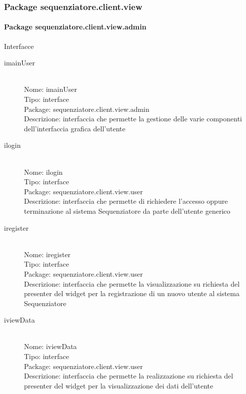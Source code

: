 \subsubsection{Package sequenziatore.client.view}
\paragraph{Package sequenziatore.client.view.admin}
Interfacce \\
\begin{description}
	\item[imainUser] 
  	\hfill \\
  	Nome: imainUser\\
  	Tipo: interface\\
	Package: sequenziatore.client.view.admin\\
	Descrizione: interfaccia che permette la gestione delle varie componenti 	dell'interfaccia grafica dell'utente
\end{description}

\begin{description}
	\item[ilogin] 
  	\hfill \\
  	Nome: ilogin\\
  	Tipo: interface\\
	Package: sequenziatore.client.view.user\\
	Descrizione: interfaccia che permette di richiedere l'accesso oppure terminazione al sistema Sequenziatore da parte dell’utente generico
\end{description}

\begin{description}
	\item[iregister] 
  	\hfill \\
  	Nome: iregister\\
  	Tipo: interface\\
	Package: sequenziatore.client.view.user\\
	Descrizione: interfaccia che permette la visualizzazione su richiesta del presenter del widget per la registrazione di un nuovo utente al sistema Sequenziatore
\end{description}

\begin{description}
	\item[iviewData] 
  	\hfill \\
  	Nome: iviewData\\
  	Tipo: interface\\
	Package: sequenziatore.client.view.user\\
	Descrizione: interfaccia che permette la realizzazione su richiesta del presenter del widget per la visualizzazione dei dati dell'utente
\end{description}

